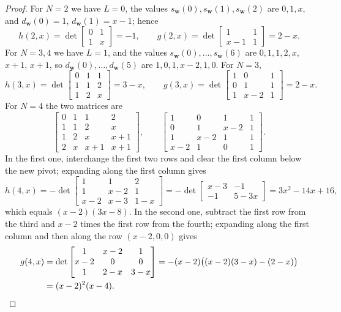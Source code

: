 \documentclass{amsart}
\theoremstyle{definition}
\theoremstyle{remark}
\numberwithin{equation}{section}
\begin{document}
\begin{proof}
For $N=2$ we have $L=0$, the values $s_{\mathbf w}(0),s_{\mathbf w}(1),s_{\mathbf w}(2)$ are $0,1,x$, and $d_{\mathbf w}(0)=1$, $d_{\mathbf w}(1)=x-1$; hence
\[
h(2,x)=\det\begin{bmatrix}0&1\\1&x\end{bmatrix}=-1,
\qquad
g(2,x)=\det\begin{bmatrix}1&1\\x-1&1\end{bmatrix}=2-x.
\]
For $N=3,4$ we have $L=1$, and the values $s_{\mathbf w}(0),\dots,s_{\mathbf w}(6)$ are $0,1,1,2,x$, $x+1$, $x+1$, so $d_{\mathbf w}(0),\dots,d_{\mathbf w}(5)$ are $1,0,1,x-2,1,0$. For $N=3$,
\[
h(3,x)=\det\begin{bmatrix}0&1&1\\1&1&2\\1&2&x\end{bmatrix}=3-x,
\qquad
g(3,x)=\det\begin{bmatrix}1&0&1\\0&1&1\\1&x-2&1\end{bmatrix}=2-x.
\]
For $N=4$ the two matrices are
\[
\begin{bmatrix}0&1&1&2\\1&1&2&x\\1&2&x&x+1\\2&x&x+1&x+1\end{bmatrix},
\qquad
\begin{bmatrix}1&0&1&1\\0&1&x-2&1\\1&x-2&1&1\\x-2&1&0&1\end{bmatrix}.
\]
In the first one, interchange the first two rows and clear the first column below the new pivot; expanding along the first column gives
\[
h(4,x)=-\det\begin{bmatrix}1&1&2\\1&x-2&1\\x-2&x-3&1-x\end{bmatrix}
=-\det\begin{bmatrix}x-3&-1\\-1&5-3x\end{bmatrix}
=3x^2-14x+16,
\]
which equals $(x-2)(3x-8)$. In the second one, subtract the first row from the third and $x-2$ times the first row from the fourth; expanding along the first column and then along the row $(x-2,0,0)$ gives
\begin{align*}
g(4,x)&=\det\begin{bmatrix}1&x-2&1\\x-2&0&0\\1&2-x&3-x\end{bmatrix}
=-(x-2)\bigl((x-2)(3-x)-(2-x)\bigr)\\
&=(x-2)^2(x-4).
\qedhere
\end{align*}
\end{proof}
\end{document}
